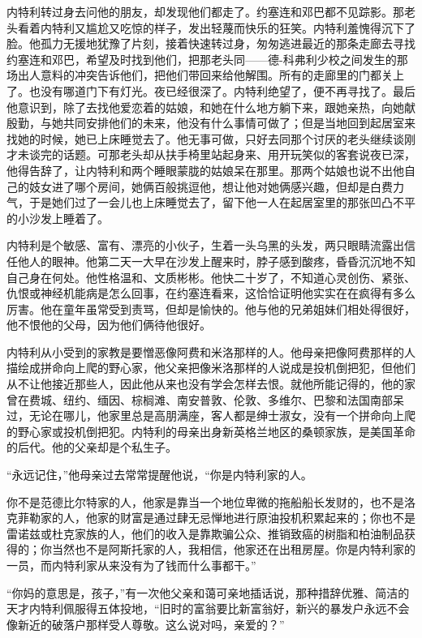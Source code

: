     内特利转过身去问他的朋友，却发现他们都走了。约塞连和邓巴都不见踪影。那老头看着内特利又尴尬又吃惊的样子，发出轻蔑而快乐的狂笑。内特利羞愧得沉下了脸。他孤力无援地犹豫了片刻，接着快速转过身，匆匆逃进最近的那条走廊去寻找约塞连和邓巴，希望及时找到他们，把那老头同——德-科弗利少校之间发生的那场出人意料的冲突告诉他们，把他们带回来给他解围。所有的走廊里的门都关上了。也没有哪道门下有灯光。夜已经很深了。内特利绝望了，便不再寻找了。最后他意识到，除了去找他爱恋着的姑娘，和她在什么地方躺下来，跟她亲热，向她献殷勤，与她共同安排他们的未来，他没有什么事情可做了；但是当地回到起居室来找她的时候，她已上床睡觉去了。他无事可做，只好去同那个讨厌的老头继续谈刚才未谈完的话题。可那老头却从扶手椅里站起身来、用开玩笑似的客套说夜已深，他得告辞了，让内特利和两个睡眼蒙胧的姑娘呆在那里。那两个姑娘也说不出他自己的妓女进了哪个房间，她俩百般挑逗他，想让他对她俩感兴趣，但却是白费力气，于是她们过了一会儿也上床睡觉去了，留下他一人在起居室里的那张凹凸不平的小沙发上睡着了。

    内特利是个敏感、富有、漂亮的小伙子，生着一头乌黑的头发，两只眼睛流露出信任他人的眼神。他第二天一大早在沙发上醒来时，脖子感到酸疼，昏昏沉沉地不知自己身在何处。他性格温和、文质彬彬。他快二十岁了，不知道心灵创伤、紧张、仇恨或神经机能病是怎么回事，在约塞连看来，这恰恰证明他实实在在疯得有多么厉害。他在童年虽常受到责骂，但却是愉快的。他与他的兄弟姐妹们相处得很好，他不恨他的父母，因为他们俩待他很好。

    内特利从小受到的家教是要憎恶像阿费和米洛那样的人。他母亲把像阿费那样的人描绘成拼命向上爬的野心家，他父亲把像米洛那样的人说成是投机倒把犯，但他们从不让他接近那些人，因此他从来也没有学会怎样去恨。就他所能记得的，他的家曾在费城、纽约、缅因、棕榈滩、南安普敦、伦敦、多维尔、巴黎和法国南部呆过，无论在哪儿，他家里总是高朋满座，客人都是绅士淑女，没有一个拼命向上爬的野心家或投机倒把犯。内特利的母亲出身新英格兰地区的桑顿家族，是美国革命的后代。他的父亲却是个私生子。

    “永远记住，”他母亲过去常常提醒他说，“你是内特利家的人。

    你不是范德比尔特家的人，他家是靠当一个地位卑微的拖船船长发财的，也不是洛克菲勒家的人，他家的财富是通过肆无忌惮地进行原油投机积累起来的；你也不是雷诺兹或杜克家族的人，他们的收入是靠欺骗公众、推销致癌的树脂和柏油制品获得的；你当然也不是阿斯托家的人，我相信，他家还在出租房屋。你是内特利家的一员，而内特利家从来没有为了钱而什么事都干。”

    “你妈的意思是，孩子，”有一次他父亲和蔼可亲地插话说，那种措辞优雅、简洁的天才内特利佩服得五体投地，“旧时的富翁要比新富翁好，新兴的暴发户永远不会像新近的破落户那样受人尊敬。这么说对吗，亲爱的？”

